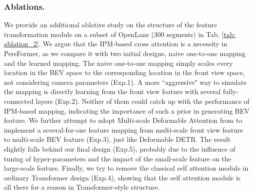 \documentclass[runningheads]{llncs}
\begin{document}
\subsubsection{Ablations.}
We provide an additional ablative study on the structure of the feature transformation module on a subset of OpenLane (300 segments) in Tab. \ref{tab: ablation_2}.
We argue that the IPM-based cross attention is a necessity in PersFormer, as we compare it with two initial designs, naive one-to-one mapping and the learned mapping.
The naive one-to-one mapping simply scales every location in the BEV space to the corresponding location in the front view space, not considering camera parameters (Exp.1).
A more ``aggressive" way to simulate the mapping is directly learning from the front view feature with several fully-connected layers (Exp.2).
Neither of them could catch up with the performance of IPM-based mapping, indicating the importance of such a prior in generating BEV feature.
We further attempt to adopt Multi-scale Deformable Attention from \cite{zhu2021deformable} to implement a several-for-one feature mapping from multi-scale front view feature to multi-scale BEV feature (Exp.3), just like Deformable DETR.
The result slightly falls behind our final design (Exp.5), probably due to the influence of tuning of hyper-parameters and the impact of the small-scale feature on the large-scale feature.
Finally, we try to remove the classical self attention module in ordinary Transformer design (Exp.4), showing that the self attention module is all there for a reason in Transformer-style structure.
\end{document}
